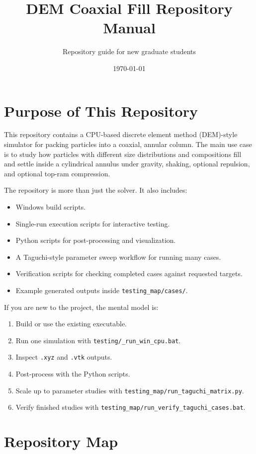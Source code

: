 \documentclass[11pt]{article}
\title{DEM Coaxial Fill Repository Manual}
\author{Repository guide for new graduate students}
\date{\today}
\begin{document}
\maketitle
\tableofcontents
\newpage

\section{Purpose of This Repository}

This repository contains a CPU-based discrete element method (DEM)-style simulator for packing particles into a coaxial, annular column. The main use case is to study how particles with different size distributions and compositions fill and settle inside a cylindrical annulus under gravity, shaking, optional repulsion, and optional top-ram compression.

The repository is more than just the solver. It also includes:
\begin{itemize}
  \item Windows build scripts.
  \item Single-run execution scripts for interactive testing.
  \item Python scripts for post-processing and visualization.
  \item A Taguchi-style parameter sweep workflow for running many cases.
  \item Verification scripts for checking completed cases against requested targets.
  \item Example generated outputs inside \texttt{testing\_map/cases/}.
\end{itemize}

If you are new to the project, the mental model is:
\begin{enumerate}
  \item Build or use the existing executable.
  \item Run one simulation with \texttt{testing/\_run\_win\_cpu.bat}.
  \item Inspect \texttt{.xyz} and \texttt{.vtk} outputs.
  \item Post-process with the Python scripts.
  \item Scale up to parameter studies with \texttt{testing\_map/run\_taguchi\_matrix.py}.
  \item Verify finished studies with \texttt{testing\_map/run\_verify\_taguchi\_cases.bat}.
\end{enumerate}

\section{Repository Map}
\end{document}
